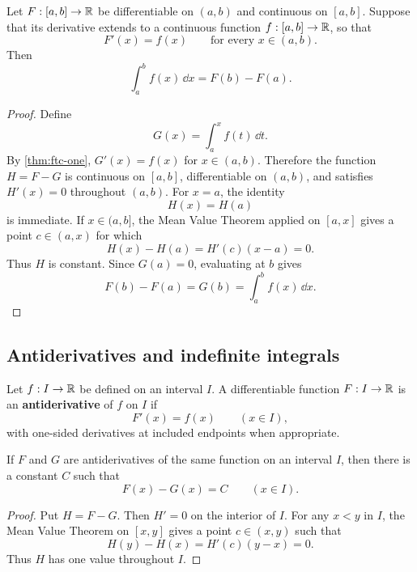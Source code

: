 \begin{theorem}
\label{thm:ftc-two}
Let $F:[a,b]\to\mathbb{R}$ be differentiable on $(a,b)$ and continuous on $[a,b]$. Suppose that its derivative extends to a continuous function $f:[a,b]\to\mathbb{R}$, so that
\[
F'(x)=f(x)
\qquad\text{for every }x\in(a,b).
\]
Then
\[
\int_a^b f(x)\,\dd x=F(b)-F(a).
\]
\end{theorem}
\begin{proof}
Define
\[
G(x)=\int_a^x f(t)\,\dd t.
\]
By \cref{thm:ftc-one}, $G'(x)=f(x)$ for $x\in(a,b)$. Therefore the function $H=F-G$ is continuous on $[a,b]$, differentiable on $(a,b)$, and satisfies $H'(x)=0$ throughout $(a,b)$. For $x=a$, the identity
\[
H(x)=H(a)
\]
is immediate. If $x\in(a,b]$, the Mean Value Theorem applied on $[a,x]$ gives a point $c\in(a,x)$ for which
\[
H(x)-H(a)=H'(c)(x-a)=0.
\]
Thus $H$ is constant. Since $G(a)=0$, evaluating at $b$ gives
\[
F(b)-F(a)=G(b)=\int_a^b f(x)\,\dd x.
\]
\end{proof}

\subsection{Antiderivatives and indefinite integrals}

\begin{definition}[Antiderivative]
\label{def:antiderivative}
Let \(f:I\to\mathbb{R}\) be defined on an interval \(I\). A differentiable function
\(F:I\to\mathbb{R}\) is an \textbf{antiderivative} of \(f\) on \(I\) if
\[
F'(x)=f(x)
\qquad(x\in I),
\]
with one-sided derivatives at included endpoints when appropriate.
\end{definition}

\begin{proposition}
\label{prop:antiderivatives-constant}
If \(F\) and \(G\) are antiderivatives of the same function on an interval
\(I\), then there is a constant \(C\) such that
\[
F(x)-G(x)=C
\qquad(x\in I).
\]
\end{proposition}
\begin{proof}
Put \(H=F-G\). Then \(H'=0\) on the interior of \(I\). For any \(x<y\)
in \(I\), the Mean Value Theorem on \([x,y]\) gives a point \(c\in(x,y)\)
such that
\[
H(y)-H(x)=H'(c)(y-x)=0.
\]
Thus \(H\) has one value throughout \(I\).
\end{proof}

